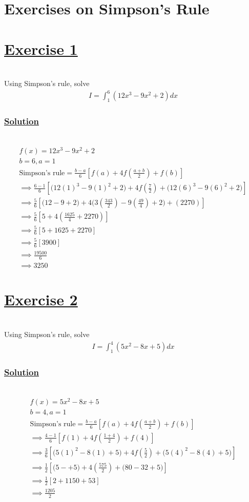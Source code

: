 \documentclass[12pt]{report}
\newcommand{\ubt}[1]{\textbf{\underline{#1}}}
\newcommand{\spn}[1]{\\[#1cm]}
\newcommand{\solution}{\subsubsection{\ubt{Solution}}{~}\spn{-2}}
\newcommand{\exercise}[1]{\section*{\ubt{Exercise #1}}{~}\spn{-1}}
\begin{document}
		\section{Exercises on Simpson's Rule}
	\exercise{1}
	Using Simpson's rule, solve
	\begin{eqnarray*}
		I = \int_1^6 (12x^3 - 9x^2 + 2) dx
	\end{eqnarray*}
	\solution
	\begin{gather*}
		f(x) = 12x^3 - 9x^2 + 2\\
		b=6, a=1\\
		\text{Simpson's rule} = \frac{b-a}{6}\left[f(a) + 4f\left(\frac{a+b}{2}\right) + f(b)\right]\\
		\implies \frac{6-1}{6}\left[\bigg(12(1)^3 - 9(1)^2 + 2\bigg) + 4f\left(\frac{7}{2}\right) + \bigg(12(6)^3 - 9(6)^2 + 2\bigg) \right]\\
		\implies \frac{5}{6}\left[\bigg(12 - 9 + 2\bigg) + 4\bigg(3\left(\frac{343}{2}\right)- 9\left(\frac{49}{4}\right) + 2\bigg) + (2270) \right]\\
		\implies\frac{5}{6}\left[5 + 4\left(\frac{1625}{4} + 2270\right)\right]\\
		\implies\frac{5}{6}\left[5 + 1625 + 2270\right]\\
		\implies\frac{5}{6}\left[3900\right]\\
		\implies\frac{19500}{6}\\
		\implies 3250
	\end{gather*}
	\newpage
	\exercise{2}
	Using Simpson's rule, solve
	\begin{gather*}
		I=\int_1^4(5x^2-8x+5)dx
	\end{gather*}
	\solution
	\begin{gather*}
		f(x) = 5x^2 - 8x + 5\\
		b=4, a=1\\
		\text{Simpson's rule} = \frac{b-a}{6}\left[f(a) + 4f\left(\frac{a+b}{2}\right) + f(b)\right]\\
		\implies \frac{4-1}{6}\left[f(1) + 4f\left(\frac{1+4}{2}\right) + f(4)\right]\\
		\implies \frac{3}{6}\left[\bigg(5(1)^2 - 8(1) + 5\bigg) + 4f\left(\frac{5}{2}\right) + \bigg(5(4)^2 - 8(4)+5\bigg)\right]\\
		\implies \frac{1}{2}\left[\bigg(5 -  + 5\bigg) + 4\left(\frac{575}{2}\right) + \bigg(80 - 32 + 5\bigg)\right]\\
		\implies \frac{1}{2}\left[2+1150 + 53\right]\\
		\implies \frac{1205}{2}
	\end{gather*}
	
\end{document}
